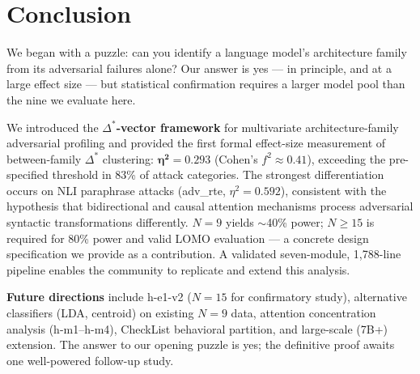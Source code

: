 \section{Conclusion}
\label{sec:conclusion}

We began with a puzzle: can you identify a language model's architecture family from its
adversarial failures alone? Our answer is yes --- in principle, and at a large effect size ---
but statistical confirmation requires a larger model pool than the nine we evaluate here.

We introduced the \textbf{$\Delta^*$-vector framework} for multivariate architecture-family
adversarial profiling and provided the first formal effect-size measurement of between-family
$\Delta^*$ clustering: $\mathbf{\eta^2=0.293}$ (Cohen's $f^2 \approx 0.41$), exceeding the
pre-specified threshold in 83\% of attack categories. The strongest differentiation occurs on NLI
paraphrase attacks (adv\_rte, $\eta^2=0.592$), consistent with the hypothesis that bidirectional
and causal attention mechanisms process adversarial syntactic transformations differently. $N=9$
yields $\sim$40\% power; $N \geq 15$ is required for 80\% power and valid LOMO evaluation ---
a concrete design specification we provide as a contribution. A validated seven-module, 1,788-line
pipeline enables the community to replicate and extend this analysis.

\textbf{Future directions} include h-e1-v2 ($N=15$ for confirmatory study), alternative
classifiers (LDA, centroid) on existing $N=9$ data, attention concentration analysis
(h-m1--h-m4), CheckList behavioral partition, and large-scale (7B+) extension. The answer to
our opening puzzle is yes; the definitive proof awaits one well-powered follow-up study.
